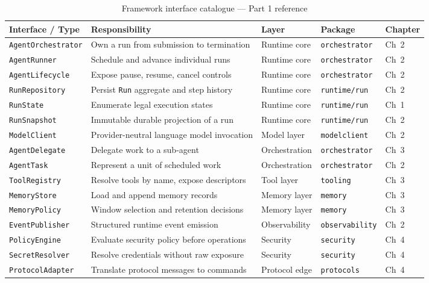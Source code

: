 \begin{table}[htbp]
\centering
\caption{Framework interface catalogue — Part 1 reference}
\label{tab:interface-catalogue}
\scriptsize
\begin{tabular}{lllll}
\toprule
\textbf{Interface / Type} & \textbf{Responsibility} & \textbf{Layer} & \textbf{Package} & \textbf{Chapter} \\
\midrule
\texttt{AgentOrchestrator} & Own a run from submission to termination     & Runtime core  & \texttt{orchestrator}    & Ch~2 \\
\texttt{AgentRunner}       & Schedule and advance individual runs         & Runtime core  & \texttt{orchestrator}    & Ch~2 \\
\texttt{AgentLifecycle}    & Expose pause, resume, cancel controls        & Runtime core  & \texttt{orchestrator}    & Ch~2 \\
\texttt{RunRepository}     & Persist \texttt{Run} aggregate and step history & Runtime core & \texttt{runtime/run}   & Ch~2 \\
\texttt{RunState}          & Enumerate legal execution states             & Runtime core  & \texttt{runtime/run}     & Ch~1 \\
\texttt{RunSnapshot}       & Immutable durable projection of a run        & Runtime core  & \texttt{runtime/run}     & Ch~2 \\
\texttt{ModelClient}       & Provider-neutral language model invocation   & Model layer   & \texttt{modelclient}     & Ch~2 \\
\texttt{AgentDelegate}     & Delegate work to a sub-agent                 & Orchestration & \texttt{orchestrator}    & Ch~3 \\
\texttt{AgentTask}         & Represent a unit of scheduled work           & Orchestration & \texttt{orchestrator}    & Ch~2 \\
\texttt{ToolRegistry}      & Resolve tools by name, expose descriptors    & Tool layer    & \texttt{tooling}         & Ch~3 \\
\texttt{MemoryStore}       & Load and append memory records               & Memory layer  & \texttt{memory}          & Ch~3 \\
\texttt{MemoryPolicy}      & Window selection and retention decisions     & Memory layer  & \texttt{memory}          & Ch~3 \\
\texttt{EventPublisher}    & Structured runtime event emission            & Observability & \texttt{observability}   & Ch~2 \\
\texttt{PolicyEngine}      & Evaluate security policy before operations   & Security      & \texttt{security}        & Ch~4 \\
\texttt{SecretResolver}    & Resolve credentials without raw exposure     & Security      & \texttt{security}        & Ch~4 \\
\texttt{ProtocolAdapter}   & Translate protocol messages to commands      & Protocol edge & \texttt{protocols}       & Ch~4 \\
\bottomrule
\end{tabular}
\end{table}

